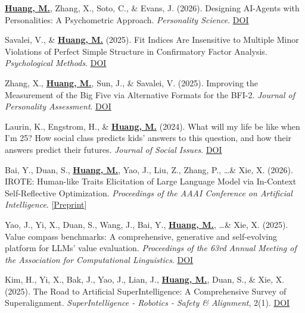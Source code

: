 \documentclass[11pt,letterpaper]{article}
\newcommand{\myname}[1]{\textbf{\uline{#1}}}
\begin{document}
\begin{enumerate}[label={[\arabic*]}]
    \item \myname{Huang, M.}, Zhang, X., Soto, C., \& Evans, J. (2026). Designing AI-Agents with Personalities: A Psychometric Approach. \textit{Personality Science}. \href{https://doi.org/10.1177/27000710251406471}{DOI}

    \item Savalei, V., \& \myname{Huang, M.} (2025). Fit Indices Are Insensitive to Multiple Minor Violations of Perfect Simple Structure in Confirmatory Factor Analysis. \textit{Psychological Methods}. \href{https://dx.doi.org/10.1037/met0000718}{DOI}

    \item Zhang, X., \myname{Huang, M.}, Sun, J., \& Savalei, V. (2025). Improving the Measurement of the Big Five via Alternative Formats for the BFI-2. \textit{Journal of Personality Assessment}. \href{https://doi.org/10.1080/00223891.2025.2531187}{DOI}

    \item Laurin, K., Engstrom, H., \& \myname{Huang, M.} (2024). What will my life be like when I'm 25? How social class predicts kids' answers to this question, and how their answers predict their futures. \textit{Journal of Social Issues}. \href{https://doi.org/10.1111/josi.12650}{DOI}

    \item Bai, Y., Duan, S., \myname{Huang, M.}, Yao, J., Liu, Z., Zhang, P., \ldots \& Xie, X. (2026). IROTE: Human-like Traits Elicitation of Large Language Model via In-Context Self-Reflective Optimization. \textit{Proceedings of the AAAI Conference on Artificial Intelligence}. [\href{https://arxiv.org/abs/2508.08719}{Preprint}]

    \item Yao, J., Yi, X., Duan, S., Wang, J., Bai, Y., \myname{Huang, M.}, \ldots \& Xie, X. (2025). Value compass benchmarks: A comprehensive, generative and self-evolving platform for LLMs' value evaluation. \textit{Proceedings of the 63rd Annual Meeting of the Association for Computational Linguistics}. \href{https://doi.org/10.18653/v1/2025.acl-demo.64}{DOI}

    \item Kim, H., Yi, X., Bak, J., Yao, J., Lian, J., \myname{Huang, M.}, Duan, S., \& Xie, X. (2025). The Road to Artificial SuperIntelligence: A Comprehensive Survey of Superalignment. \textit{SuperIntelligence - Robotics - Safety \& Alignment}, 2(1). \href{https://doi.org/10.70777/si.v2i1.13963}{DOI}
\end{enumerate}
\end{document}
